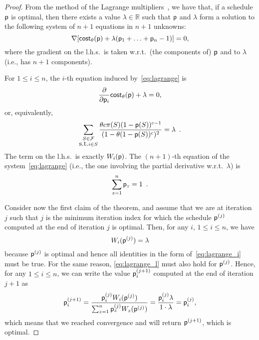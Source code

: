 \begin{proof}
	From the method of the Lagrange multipliers~\citep[Sect.~5.1]{BoydV04}, we
	have that, if a schedule $\mathsf{p}$ is optimal, then there exists a value
	$\lambda\in\mathbb{R}$ such that $\mathsf{p}$ and $\lambda$ form a solution to
	the following system of $n+1$ equations in $n+1$ unknowns:
	\begin{equation}\label{eq:lagrange}
		\nabla [\mathsf{cost}_\theta(\mathsf{p}) + \lambda (\mathsf{p}_1+\ldots+\mathsf{p}_n-1)] = 0,
	\end{equation}
	where the gradient on the l.h.s.~is taken w.r.t.~(the components of)
	$\mathsf{p}$ and to $\lambda$ (i.e., has $n+1$ components).

	For $1\le i\le n$, the $i$-th equation induced by~\eqref{eq:lagrange} is
	\[
		\frac{\partial}{\partial \mathsf{p}_i} \mathsf{cost}_\theta(\mathsf{p}) + \lambda = 0,
	\]
	or, equivalently,
	\begin{equation}\label{eq:lagrange_i}
		\sum_{\substack{S\in\mathcal{F}\\\mbox{s.t.} i\in S}} \frac{\theta c
			\pi(S) (1-\mathsf{p}(S))^{c-1}}{(1-\theta(1-\mathsf{p}(S))^c)^2} =
			\lambda\enspace.
	\end{equation}
	The term on the l.h.s.~is exactly $W_i(\mathsf{p})$.
	The $(n+1)$-th equation of the system~\eqref{eq:lagrange} (i.e., the one
	involving the partial derivative w.r.t.~$\lambda$) is
	\begin{equation}\label{eq:lagrange_l}
		\sum_{z=1}^n \mathsf{p}_z = 1\enspace.
	\end{equation}

	Consider now the first claim of the theorem, and assume that we
	are at iteration $j$ such that $j$ is the minimum iteration index for which
	the schedule $\mathsf{p}^{(j)}$ computed at the end of iteration $j$ is optimal.
	Then, for any $i$, $1\le i\le n$, we have
	\[
		W_i(\mathsf{p}^{(j)})=\lambda
	\]
	because $\mathsf{p}^{(j)}$ is optimal and hence all identities in the form
	of~\eqref{eq:lagrange_i} must be true. For the same reason,
	\eqref{eq:lagrange_l} must also hold for $\mathsf{p}^{(j)}$.
	Hence, for any $1\le i\le n$, we can write the value $\mathsf{p}^{(j+1)}_i$
	computed at the end of iteration $j+1$ as
	\[
		\mathsf{p}^{(j+1)}_i = \frac{\mathsf{p}^{(j)}_i W_i(\mathsf{p}^{(j)})}{\sum_{z=1}^n
		\mathsf{p}^{(j)}_z W_z(\mathsf{p}^{(j)})}=
		\frac{\mathsf{p}^{(j)}_i\lambda}{1\cdot\lambda}=\mathsf{p}^{(j)}_i,
	\]
	which means that we reached convergence and \algoname will return
	$\mathsf{p}^{(j+1)}$, which is optimal. %


\end{proof}
